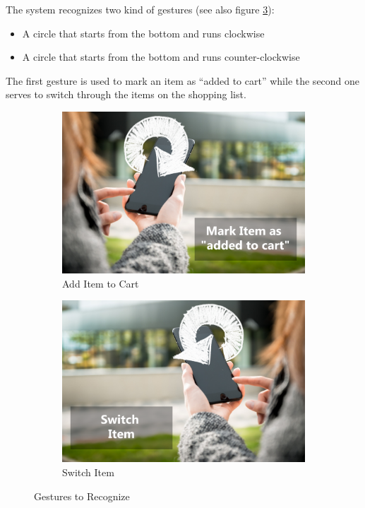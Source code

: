 The system recognizes two kind of gestures (see also figure
\ref{fig:gesturesToRecognize}):
\begin{itemize}
  \item A circle that starts from the bottom and runs clockwise
  \item A circle that starts from the bottom and runs counter-clockwise
\end{itemize}
The first gesture is used to mark an item as ``added to cart'' while the second
one serves to switch through the items on the shopping list.

\begin{figure}[h]
\captionsetup{justification=centering}
\begin{subfigure}{0.475\textwidth}
\includegraphics[width=\textwidth]{res/gestures/addToCart.png}
\caption{Add Item to Cart}
\label{fig:gestureAdd}
\end{subfigure} \hspace{0.05\textwidth}
\begin{subfigure}{0.475\textwidth}
\includegraphics[width=\textwidth]{res/gestures/removeFromCart.png}
\caption{Switch Item}
\label{fig:gestureRemove}
\end{subfigure}
\caption{Gestures to Recognize}
\label{fig:gesturesToRecognize}
\end{figure}

